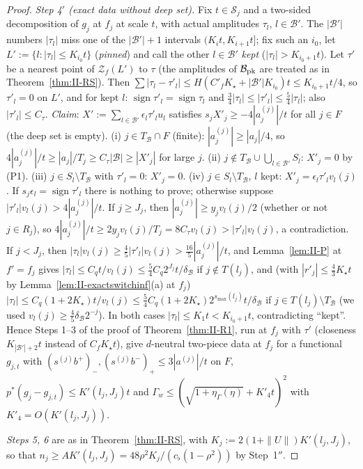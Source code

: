 \documentclass[10pt]{amsart}
\theoremstyle{definition}
\theoremstyle{remark}
\newcommand{\sgn}{\operatorname{sign}}
\begin{document}
\begin{proof}
\emph{Step 4$'$ (exact data without deep set).}  Fix $t\in\mathcal S_j$ and a
two-sided decomposition of $g_j$ at $f_j$ at scale $t$, with actual
amplitudes $\tau_l$, $l\in\mathcal B'$.  The $|\mathcal B'|$ numbers $|\tau_l|$
miss one of the $|\mathcal B'|+1$ intervals $(K_it,K_{i+1}t]$; fix such an
$i_0$, let $L':=\{l:|\tau_l|\le K_{i_0}t\}$ (\emph{pinned}) and call the other
$l\in\mathcal B'$ \emph{kept} ($|\tau_l|>K_{i_0+1}t$).  Let $\tau'$ be a nearest
point of $\mathcal Z_f(L')$ to $\tau$ (the amplitudes of $\mathcal
B_{\rm pk}$ are treated as in Theorem~\ref{thm:II-RS}).  Then
$\sum|\tau_l-\tau'_l|\le H(C'_fK_\star+|\mathcal B'|K_{i_0})t\le K_{i_0+1}t/4$,
so $\tau'_l=0$ on $L'$, and for kept $l$: $\sgn\tau'_l=\sgn\tau_l$ and
$\frac34|\tau_l|\le|\tau'_l|\le\frac54|\tau_l|$; also $|\tau'_l|\le C_\tau$.
\emph{Claim}: $X':=\sum_{l\in\mathcal B'}\epsilon_l\tau'_lu_l$ satisfies
$s_jX'_j\ge-4|a^{(j)}_j|/t$ for all $j\in F$ (the deep set is empty).
(i) $j\in T_{\mathcal B}\cap F$ (finite): $|a^{(j)}_j|\ge|a_j|/4$, so
$4|a^{(j)}_j|/t\ge|a_j|/T_j\ge C_\tau|\mathcal B|\ge|X'_j|$ for large $j$.
(ii) $j\notin T_{\mathcal B}\cup\bigcup_{l\in\mathcal B'}S_l$: $X'_j=0$ by (P1).
(iii) $j\in S_l\setminus T_{\mathcal B}$ with $\tau'_l=0$: $X'_j=0$.
(iv) $j\in S_l\setminus T_{\mathcal B}$, $l$ kept: $X'_j=\epsilon_l\tau'_lv_l(j)$.
If $s_j\epsilon_l=\sgn\tau'_l$ there is nothing to prove; otherwise suppose
$|\tau'_l|v_l(j)>4|a^{(j)}_j|/t$.  If $j\ge J_j$, then $|a^{(j)}_j|\ge
y_jv_l(j)/2$ (whether or not $j\in R_j$), so $4|a^{(j)}_j|/t\ge2y_jv_l(j)/T_j=
8C_\tau v_l(j)>|\tau'_l|v_l(j)$, a contradiction.  If $j<J_j$, then
$|\tau_l|v_l(j)\ge\frac45|\tau'_l|v_l(j)>\frac{16}5|a^{(j)}_j|/t$, and
Lemma~\ref{lem:II-P} at $f'=f_j$ gives $|\tau_l|\le C_qt/v_l(j)\le\frac54C_q
2^{J_j}t/\delta_{\mathcal B}$ if $j\notin T(l_j)$, and (with $|r'_j|\le\frac43
K_\star t$ by Lemma~\ref{lem:II-exactswitchinf}(a) at $f_j$) $|\tau_l|\le
C_q(1+2K_\star)t/v_l(j)\le\frac54C_q(1+2K_\star)2^{s_{\max}(l_j)}t/
\delta_{\mathcal B}$ if $j\in T(l_j)\setminus T_{\mathcal B}$ (we used
$v_l(j)\ge\frac45\delta_{\mathcal B}2^{-j}$).  In both cases $|\tau_l|\le K_1t
<K_{i_0+1}t$, contradicting ``kept''.
Hence Steps 1--3 of the proof of Theorem~\ref{thm:II-R1}, run at $f_j$ with
$\tau'$ (closeness $K_{|\mathcal B'|+2}t$ instead of $C_fK_\star t$), give
$d$-neutral two-piece data at $f_j$ for a functional $g_{j,t}$ with
$(s^{(j)}b^+)_-,(s^{(j)}b^-)_+\le3|a^{(j)}|/t$ on $F$,
$p^*(g_j-g_{j,t})\le K'(l_j,J_j)t$ and $\Gamma_w\le(\sqrt{1+\eta_\Gamma(\eta)}+
K'_4t)^2$ with $K'_4=O(K'(l_j,J_j))$.

\emph{Steps 5, 6} are as in Theorem~\ref{thm:II-RS}, with
$K_j:=2(1+\|U\|)K'(l_j,J_j)$, so that $n_j\ge AK'(l_j,J_j)=48\rho^2K_j/
(c_\flat(1-\rho^2))$ by Step~1$''$.
\end{proof}
\end{document}
